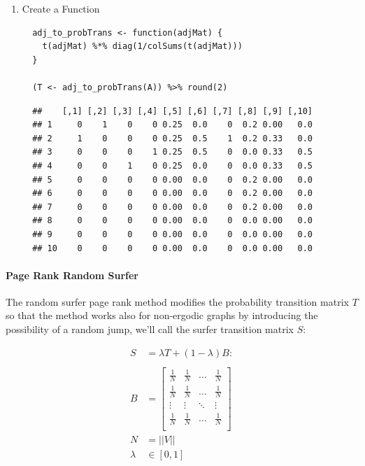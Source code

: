 \documentclass[11pt]{article}
\begin{document}
\begin{enumerate}
\item Create a Function
\label{create-a-function}
\begin{verbatim}
  adj_to_probTrans <- function(adjMat) {
    t(adjMat) %*% diag(1/colSums(t(adjMat)))
  }

  (T <- adj_to_probTrans(A)) %>% round(2)
\end{verbatim}

\begin{verbatim}
  ##    [,1] [,2] [,3] [,4] [,5] [,6] [,7] [,8] [,9] [,10]
  ## 1     0    1    0    0 0.25  0.0    0  0.2 0.00   0.0
  ## 2     1    0    0    0 0.25  0.5    1  0.2 0.33   0.0
  ## 3     0    0    0    1 0.25  0.5    0  0.0 0.33   0.5
  ## 4     0    0    1    0 0.25  0.0    0  0.0 0.33   0.5
  ## 5     0    0    0    0 0.00  0.0    0  0.2 0.00   0.0
  ## 6     0    0    0    0 0.00  0.0    0  0.2 0.00   0.0
  ## 7     0    0    0    0 0.00  0.0    0  0.2 0.00   0.0
  ## 8     0    0    0    0 0.00  0.0    0  0.0 0.00   0.0
  ## 9     0    0    0    0 0.00  0.0    0  0.0 0.00   0.0
  ## 10    0    0    0    0 0.00  0.0    0  0.0 0.00   0.0
\end{verbatim}
\end{enumerate}

\paragraph{Page Rank Random Surfer}
\label{page-rank-random-surfer}
The random surfer page rank method modifies the probability transition
matrix \(T\) so that the method works also for non-ergodic graphs by
introducing the possibility of a random jump, we'll call the surfer
transition matrix \(S\):

\begin{align}
    S &= \lambda T +  \left( 1- \lambda \right)B :\\
\ \\
    B&= \begin{bmatrix}
    \frac{1}{N} & \frac{1}{N} & \ldots & \frac{1}{N} \\
    \frac{1}{N} & \frac{1}{N} & \ldots & \frac{1}{N} \\
        \vdots      & \vdots      & \ddots & \vdots  \\
    \frac{1}{N} & \frac{1}{N} & \ldots & \frac{1}{N} \\
    \end{bmatrix} \label{eq:bgval1} \\
    N&= \left| \left| V \right| \right| \\
    \lambda &\in [0,1]
\end{align}
\end{document}
